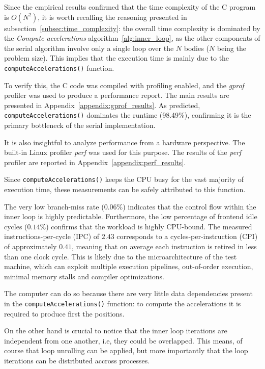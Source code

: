 \documentclass{article}
\begin{document}
Since the empirical results confirmed that the time complexity of the C program is $O(N^2)$, it is worth recalling the reasoning presented in subsection~\ref{subsec:time_complexity}: the overall time complexity is dominated by the \emph{Compute accelerations} algorithm~\ref{alg:inner_loop}, as the other components of the serial algorithm involve only a single loop over the $N$ bodies ($N$ being the problem size).
This implies that the execution time is mainly due to the \texttt{compute\discretionary{}{}{}Accelerations()} function.

To verify this, the C code was compiled with profiling enabled, and the \emph{gprof} profiler 
was used to produce a performance report. The main results are presented in 
Appendix~\ref{appendix:gprof_results}.
As predicted, \texttt{computeAccelerations()} dominates the runtime (98.49\%), confirming it is the primary bottleneck of the serial implementation.

It is also insightful to analyze performance from a hardware perspective. The built-in Linux profiler \emph{perf} was used for this purpose.
The results of the \emph{perf} profiler are reported in Appendix~\ref{appendix:perf_results}.

Since \texttt{compute\discretionary{}{}{}Accelerations()} keeps the CPU busy for the vast majority of execution time, these measurements can be safely attributed to this function.

The very low branch-miss rate ($0.06\%$) indicates that the control flow within the inner loop is highly predictable. Furthermore, the low percentage of frontend idle cycles ($0.14\%$) confirms that the workload is highly CPU-bound.
The measured instructions-per-cycle (IPC) of $2.43$ corresponds to a cycles-per-instruction (CPI) of approximately $0.41$, meaning that on average each instruction is retired in less than one clock cycle. This is likely due to the microarchitecture of the test machine, which can exploit multiple execution pipelines, out-of-order execution, minimal memory stalls and compiler optimizations.

The computer can do so because there are very little data dependencies present in the \texttt{compute\discretionary{}{}{}Accelerations()} function: to compute the accelerations it is required to produce first the positions.

On the other hand is crucial to notice that the inner loop iterations are independent from one another, i.e, they could be overlapped.
This means, of course that loop unrolling can be applied, but more importantly that the loop iterations can be distributed accross processes.
\end{document}
